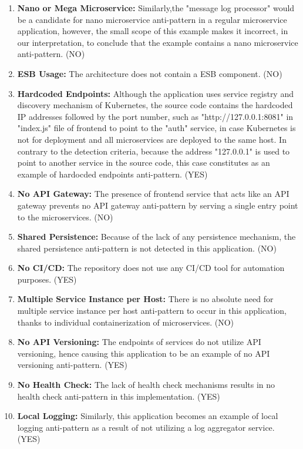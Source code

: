 \documentclass{Configuration_Files/PoliMi3i_thesis}
\begin{document}
\begin{enumerate}
    \item \textbf{Nano or Mega Microservice:} Similarly,the "message log processor" would be a candidate for nano microservice anti-pattern in a regular microservice application, however, the small scope of this example makes it incorrect, in our interpretation, to conclude that the example contains a nano microservice anti-pattern. (NO)
    
    \item \textbf{ESB Usage:} The architecture does not contain a ESB component. (NO)
    
    \item \textbf{Hardcoded Endpoints:} Although the application uses service registry and discovery mechanism of Kubernetes, the source code contains the hardcoded IP addresses followed by the port number, such as "http://127.0.0.1:8081" in "index.js" file of frontend to point to the "auth" service, in case Kubernetes is not for deployment and all microservices are deployed to the same host.
    In contrary to the detection criteria, because the address "127.0.0.1" is used to point to another service in the source code, this case constitutes as an example of hardocded endpoints anti-pattern. (YES)
    
    \item \textbf{No API Gateway:} The presence of frontend service that acts like an API gateway prevents no API gateway anti-pattern by serving a single entry point to the microservices. (NO)
    
    \item \textbf{Shared Persistence:} Because of the lack of any persistence mechanism, the shared persistence anti-pattern is not detected in this application. (NO)
    
    \item \textbf{No CI/CD:} The repository does not use any CI/CD tool for automation purposes. (YES)
    
    \item \textbf{Multiple Service Instance per Host:} There is no absolute need for multiple service instance per host anti-pattern to occur in this application, thanks to individual containerization of microservices. (NO)
    
    \item \textbf{No API Versioning:} The endpoints of services do not utilize API versioning, hence causing this application to be an example of no API versioning anti-pattern. (YES)
    
    \item \textbf{No Health Check:} The lack of health check mechanisms results in no health check anti-pattern in this implementation. (YES)
    
    \item \textbf{Local Logging:} Similarly, this application becomes an example of local logging anti-pattern as a result of not utilizing a log aggregator service. (YES)
\end{enumerate}
\end{document}

